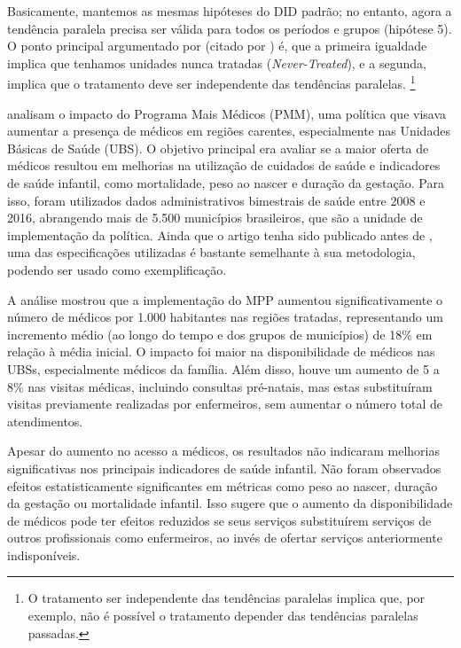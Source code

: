 \documentclass[portugues]{article}
\begin{document}
Basicamente, mantemos as mesmas hipóteses do DID padrão; no entanto, agora a tendência paralela precisa ser válida para todos os períodos e grupos (hipótese 5). O ponto principal argumentado por \cite{marcus2021role} (citado por \cite{callaway2021difference}) é, que a primeira igualdade implica que tenhamos unidades nunca tratadas (\textit{Never-Treated}), e a segunda, implica que o tratamento deve ser independente das tendências paralelas. \footnote{O tratamento ser independente das tendências paralelas implica que, por exemplo, não é possível o tratamento depender das tendências paralelas passadas.}
\begin{boxaplicado}
    \cite{carilloferes} analisam o impacto do Programa Mais Médicos (PMM), uma política que visava aumentar a presença de médicos em regiões carentes, especialmente nas Unidades Básicas de Saúde (UBS). O objetivo principal era avaliar se a maior oferta de médicos resultou em melhorias na utilização de cuidados de saúde e indicadores de saúde infantil, como mortalidade, peso ao nascer e duração da gestação. Para isso, foram utilizados dados administrativos bimestrais de saúde entre 2008 e 2016, abrangendo mais de 5.500 municípios brasileiros, que são a unidade de implementação da política. Ainda que o artigo tenha sido publicado antes de \cite{sun2021estimating}, uma das especificações utilizadas é bastante semelhante à sua metodologia, podendo ser usado como exemplificação. 

A análise mostrou que a implementação do MPP aumentou significativamente o número de médicos por 1.000 habitantes nas regiões tratadas, representando um incremento médio (ao longo do tempo e dos grupos de municípios) de 18\% em relação à média inicial. O impacto foi maior na disponibilidade de médicos nas UBSs, especialmente médicos da família. Além disso, houve um aumento de 5 a 8\% nas visitas médicas, incluindo consultas pré-natais, mas estas substituíram visitas previamente realizadas por enfermeiros, sem aumentar o número total de atendimentos.

Apesar do aumento no acesso a médicos, os resultados não indicaram melhorias significativas nos principais indicadores de saúde infantil. Não foram observados efeitos estatisticamente significantes em métricas como peso ao nascer, duração da gestação ou mortalidade infantil. Isso sugere que o aumento da disponibilidade de médicos pode ter efeitos reduzidos se seus serviços substituírem serviços de outros profissionais como enfermeiros, ao invés de ofertar serviços anteriormente indisponíveis.

\end{boxaplicado}
\end{document}
